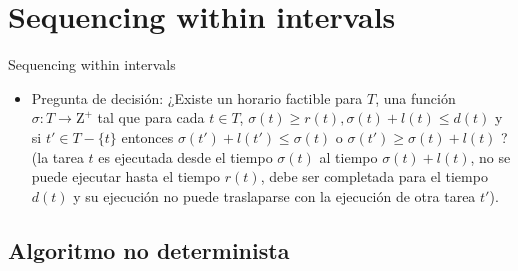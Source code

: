 \renewcommand{\sectiontitle}{Sequencing within intervals}
\section{\sectiontitle}

\begin{frame}{\sectiontitle}
    \begin{itemize}
        \itemj Ejemplar genérico: Un conjunto finito $T$ de tareas y por cada $t\in T$, un entero \textit{tiempo de liberación} $r(t)\geqslant 0$, un \textit{tiempo limite} $d(t)\in \mathrm{Z}^+$ y una longitud $l(t)\in \mathrm{Z}^+$.
        
        \item Pregunta de decisión: ¿Existe un horario factible para $T$, una función $\sigma:T\to \mathrm{Z}^+$ tal que para cada $t\in T$, $\sigma(t)\geqslant r(t), \sigma(t) + l(t)\leqslant d(t)$ y si $t'\in T-\{t\}$ entonces $\sigma(t')+l(t') \leqslant \sigma(t)$ o $\sigma(t') \geqslant \sigma(t) + l(t)$ ?\\
        (la tarea $t$ es ejecutada desde el tiempo $\sigma(t)$ al tiempo $\sigma(t) + l(t)$, no se puede ejecutar hasta el tiempo $r(t)$, debe ser completada para el tiempo $d(t)$ y su ejecución no puede traslaparse con la ejecución de otra tarea $t'$).
    \end{itemize}
\end{frame}

\renewcommand{\subsectiontitle}{Algoritmo no determinista}
\subsection{\subsectiontitle}

